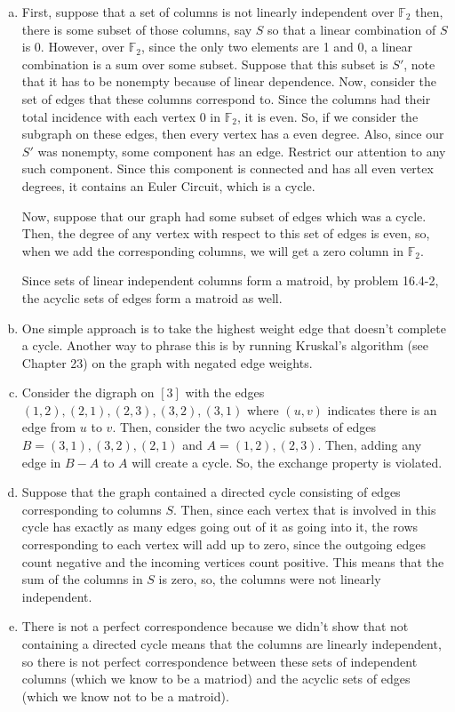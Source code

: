 \documentclass{article}
\begin{document}
\begin{enumerate}[a.]
\item
First, suppose that a set of columns is not linearly independent over $\mathbb{F}_2$ then, there is some subset of those columns, say $S$ so that a linear combination of $S$ is 0. However, over $\mathbb{F}_2$, since the only two elements are 1 and 0, a linear combination is a sum over some subset. Suppose that this subset is $S'$, note that it has to be nonempty because of linear dependence. Now, consider the set of edges that these columns correspond to. Since the columns had their total incidence with each vertex 0 in $\mathbb{F}_2$, it is even. So, if we consider the subgraph on these edges, then every vertex has a even degree. Also, since our $S'$ was nonempty, some component has an edge. Restrict our attention to any such component. Since this component is connected and has all even vertex degrees, it contains an Euler Circuit, which is a cycle.

Now, suppose that our graph had some subset of edges which was a cycle. Then, the degree of any vertex with respect to this set of edges is even, so, when we add the corresponding columns, we will get a zero column in $\mathbb{F}_2$.

Since sets of linear independent columns form a matroid, by problem 16.4-2, the acyclic sets of edges form a matroid as well.
\item
One simple approach is to take the highest weight edge that doesn't complete a cycle. Another way to phrase this is by running Kruskal's algorithm (see Chapter 23) on the graph with negated edge weights.
\item
Consider the digraph on $[3]$ with the edges $(1,2),(2,1),(2,3),(3,2),(3,1)$ where $(u,v)$ indicates there is an edge from $u$ to $v$. Then, consider the two acyclic subsets of edges $B = (3,1),(3,2),(2,1)$ and $A = (1,2),(2,3)$. Then, adding any edge in $B-A$ to $A$ will create a cycle. So, the exchange property is violated.
\item
Suppose that the graph contained a directed cycle consisting of edges corresponding to columns $S$. Then, since each vertex that is involved in this cycle has exactly as many edges going out of it as going into it, the rows corresponding to each vertex will add up to zero, since the outgoing edges count negative and the incoming vertices count positive. This means that the sum of the columns in $S$ is zero, so, the columns were not linearly independent.


\item
There is not a perfect correspondence because we didn't show that not containing a directed cycle means that the columns are linearly independent, so there is not perfect correspondence between these sets of independent columns (which we know to be a matriod) and the acyclic sets of edges (which we know not to be a matroid).
\end{enumerate}
\end{document}
